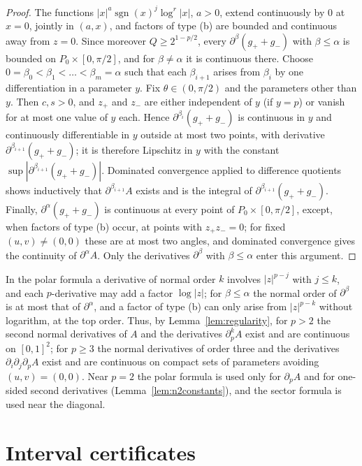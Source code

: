 \documentclass[11pt]{amsart}
\theoremstyle{definition}
\theoremstyle{remark}
\numberwithin{equation}{section}
\newcommand{\sgn}{\operatorname{sgn}}
\begin{document}
\begin{proof}
The functions $|x|^{a}\sgn(x)^j\log^r|x|$, $a>0$, extend continuously by $0$ at $x=0$, jointly in $(a,x)$, and factors of type (b) are bounded and continuous away from $z=0$. Since moreover $Q\ge2^{1-p/2}$, every $\partial^\beta(g_++g_-)$ with $\beta\le\alpha$ is bounded on $P_0\times[0,\pi/2]$, and for $\beta\ne\alpha$ it is continuous there. Choose $0=\beta_0<\beta_1<\dots<\beta_m=\alpha$ such that each $\beta_{i+1}$ arises from $\beta_i$ by one differentiation in a parameter $y$. Fix $\theta\in(0,\pi/2)$ and the parameters other than $y$. Then $c,s>0$, and $z_+$ and $z_-$ are either independent of $y$ (if $y=p$) or vanish for at most one value of $y$ each. Hence $\partial^{\beta_i}(g_++g_-)$ is continuous in $y$ and continuously differentiable in $y$ outside at most two points, with derivative $\partial^{\beta_{i+1}}(g_++g_-)$; it is therefore Lipschitz in $y$ with the constant $\sup|\partial^{\beta_{i+1}}(g_++g_-)|$. Dominated convergence applied to difference quotients shows inductively that $\partial^{\beta_{i+1}}A$ exists and is the integral of $\partial^{\beta_{i+1}}(g_++g_-)$. Finally, $\partial^\alpha(g_++g_-)$ is continuous at every point of $P_0\times[0,\pi/2]$, except, when factors of type (b) occur, at points with $z_+z_-=0$; for fixed $(u,v)\ne(0,0)$ these are at most two angles, and dominated convergence gives the continuity of $\partial^\alpha A$. Only the derivatives $\partial^\beta$ with $\beta\le\alpha$ enter this argument.
\end{proof}

In the polar formula a derivative of normal order $k$ involves $|z|^{p-j}$ with $j\le k$, and each $p$-derivative may add a factor $\log|z|$; for $\beta\le\alpha$ the normal order of $\partial^\beta$ is at most that of $\partial^\alpha$, and a factor of type (b) can only arise from $|z|^{p-k}$ without logarithm, at the top order. Thus, by Lemma~\ref{lem:regularity}, for $p>2$ the second normal derivatives of $A$ and the derivatives $\partial_p^kA$ exist and are continuous on $[0,1]^2$; for $p\ge3$ the normal derivatives of order three and the derivatives $\partial_i\partial_j\partial_pA$ exist and are continuous on compact sets of parameters avoiding $(u,v)=(0,0)$. Near $p=2$ the polar formula is used only for $\partial_pA$ and for one-sided second derivatives (Lemma~\ref{lem:n2constants}), and the sector formula is used near the diagonal.

\section{Interval certificates}\label{sec:numerics}
\end{document}
